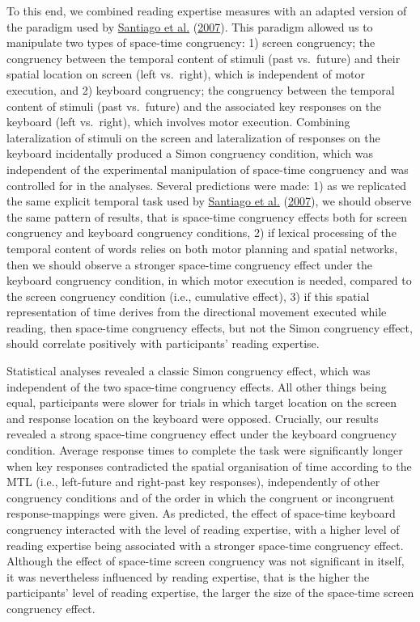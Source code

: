 \documentclass[
  a4paper,12pt,twoside,onecolumn,openright,final,oldfontcommands]{memoir}
\begin{document}
To this end, we combined reading expertise measures with an adapted version of the paradigm used by \protect\hyperlink{ref-santiago_time_2007}{Santiago et al.} (\protect\hyperlink{ref-santiago_time_2007}{2007}). This paradigm allowed us to manipulate two types of space-time congruency: 1) screen congruency; the congruency between the temporal content of stimuli (past vs.~future) and their spatial location on screen (left vs.~right), which is independent of motor execution, and 2) keyboard congruency; the congruency between the temporal content of stimuli (past vs.~future) and the associated key responses on the keyboard (left vs.~right), which involves motor execution. Combining lateralization of stimuli on the screen and lateralization of responses on the keyboard incidentally produced a Simon congruency condition, which was independent of the experimental manipulation of space-time congruency and was controlled for in the analyses. Several predictions were made: 1) as we replicated the same explicit temporal task used by \protect\hyperlink{ref-santiago_time_2007}{Santiago et al.} (\protect\hyperlink{ref-santiago_time_2007}{2007}), we should observe the same pattern of results, that is space-time congruency effects both for screen congruency and keyboard congruency conditions, 2) if lexical processing of the temporal content of words relies on both motor planning and spatial networks, then we should observe a stronger space-time congruency effect under the keyboard congruency condition, in which motor execution is needed, compared to the screen congruency condition (i.e., cumulative effect), 3) if this spatial representation of time derives from the directional movement executed while reading, then space-time congruency effects, but not the Simon congruency effect, should correlate positively with participants' reading expertise.

Statistical analyses revealed a classic Simon congruency effect, which was independent of the two space-time congruency effects. All other things being equal, participants were slower for trials in which target location on the screen and response location on the keyboard were opposed. Crucially, our results revealed a strong space-time congruency effect under the keyboard congruency condition. Average response times to complete the task were significantly longer when key responses contradicted the spatial organisation of time according to the MTL (i.e., left-future and right-past key responses), independently of other congruency conditions and of the order in which the congruent or incongruent response-mappings were given. As predicted, the effect of space-time keyboard congruency interacted with the level of reading expertise, with a higher level of reading expertise being associated with a stronger space-time congruency effect. Although the effect of space-time screen congruency was not significant in itself, it was nevertheless influenced by reading expertise, that is the higher the participants' level of reading expertise, the larger the size of the space-time screen congruency effect.
\end{document}
